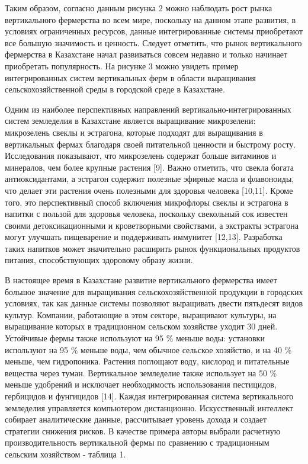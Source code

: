 \begin{multicols}{2}
Таким образом, согласно данным рисунка 2 можно наблюдать рост рынка
вертикального фермерства во всем мире, поскольку на данном этапе
развития, в условиях ограниченных ресурсов, данные интегрированные
системы приобретают все большую значимость и ценность. Следует отметить,
что рынок вертикального фермерства в Казахстане начал развиваться совсем
недавно и только начинает приобретать популярность. На рисунке 3 можно
увидеть пример интегрированных систем вертикальных ферм в области
выращивания сельскохозяйственной среды в городской среде в Казахстане.

Одним из наиболее перспективных направлений вертикально-интегрированных
систем земледелия в Казахстане является выращивание микрозелени:
микрозелень свеклы и эстрагона, которые подходят для выращивания в
вертикальных фермах благодаря своей питательной ценности и быстрому
росту. Исследования показывают, что микрозелень содержат больше
витаминов и минералов, чем более крупные растения {[}9{]}. Важно
отметить, что свекла богата антиоксидантами, а эстрагон содержит
полезные эфирные масла и флавоноиды, что делает эти растения очень
полезными для здоровья человека {[}10,11{]}. Кроме того, это
перспективный способ включения микрофлоры свеклы и эстрагона в напитки с
пользой для здоровья человека, поскольку свекольный сок известен своими
детоксикационными и кроветворными свойствами, а экстракты эстрагона
могут улучшать пищеварение и поддерживать иммунитет {[}12,13{]}.
Разработка таких напитков может значительно расширить рынок
функциональных продуктов питания, способствующих здоровому образу жизни.

В настоящее время в Казахстане развитие вертикального фермерства имеет
большое значение для выращивания сельскохозяйственной продукции в
городских условиях, так как данные системы позволяют выращивать двести
пятьдесят видов культур. Компании, работающие в этом секторе, выращивают
культуры, на выращивание которых в традиционном сельском хозяйстве
уходит 30 дней. Устойчивые фермы также используют на 95 \% меньше воды:
установки используют на 95 \% меньше воды, чем обычное сельское
хозяйство, и на 40 \% меньше, чем гидропоника. Растения поглощают воду,
кислород и питательные вещества через туман. Вертикальное земледелие
также использует на 50 \% меньше удобрений и исключает необходимость
использования пестицидов, гербицидов и фунгицидов {[}14{]}. Каждая
интегрированная система вертикального земледелия управляется компьютером
дистанционно. Искусственный интеллект собирает аналитические данные,
рассчитывает уровень дохода и создает стратегии снижения рисков. В
качестве примера авторы выбрали расчетную производительность
вертикальной фермы по сравнению с традиционным сельским хозяйством -
таблица 1.


\end{multicols}
